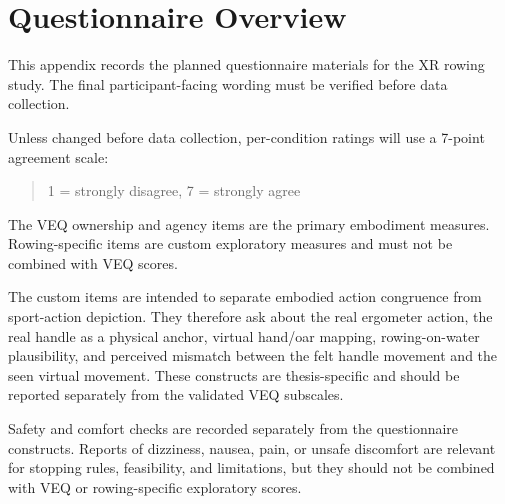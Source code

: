\section{Questionnaire Overview}
\label{app:questionnaires_overview}

This appendix records the planned questionnaire materials for the XR rowing study. The final participant-facing wording must be verified before data collection.


Unless changed before data collection, per-condition ratings will use a 7-point agreement scale:

\begin{quote}
1 = strongly disagree, 7 = strongly agree
\end{quote}

The VEQ ownership and agency items are the primary embodiment measures. Rowing-specific items are custom exploratory measures and must not be combined with VEQ scores.

The custom items are intended to separate embodied action congruence from sport-action depiction. They therefore ask about the real ergometer action, the real handle as a physical anchor, virtual hand/oar mapping, rowing-on-water plausibility, and perceived mismatch between the felt handle movement and the seen virtual movement. These constructs are thesis-specific and should be reported separately from the validated VEQ subscales.

Safety and comfort checks are recorded separately from the questionnaire constructs. Reports of dizziness, nausea, pain, or unsafe discomfort are relevant for stopping rules, feasibility, and limitations, but they should not be combined with VEQ or rowing-specific exploratory scores.
